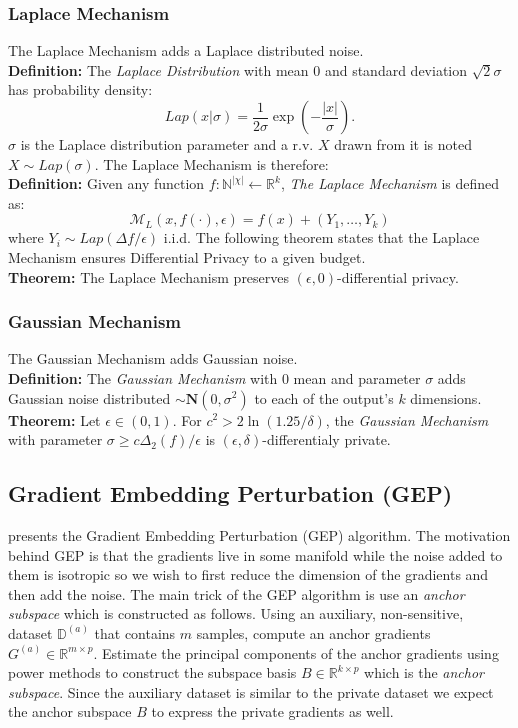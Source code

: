 \documentclass[fourier]{_style/dissertation}
\begin{document}
\subsubsection{Laplace Mechanism}
The Laplace Mechanism adds a Laplace distributed noise. \\
\textbf{Definition:} The \textit{Laplace Distribution} with mean 0 and standard deviation $\sqrt{2} \sigma$ has probability density:
$$ Lap(x|\sigma)=\frac{1}{2\sigma}\exp \left (- \frac{|x|}{\sigma} \right ).$$ $\sigma$ is the Laplace distribution parameter and a r.v. $X$ drawn from it is noted $X \sim Lap(\sigma)$.
The Laplace Mechanism is therefore: \\
\textbf{Definition:} Given any function $f:\mathbb{N}^{|\chi|} \leftarrow \mathbb{R}^{k}$, \textit{The Laplace Mechanism} is defined as:
$$ \mathcal{M}_{L}(x,f(\cdot), \epsilon) = f(x)+(Y_{1},\ldots ,Y_{k})$$
where $Y_{i} \sim Lap(\Delta f / \epsilon)$ i.i.d.
The following theorem states that the Laplace Mechanism ensures Differential Privacy to a given budget. \\
\textbf{Theorem:} The Laplace Mechanism preserves $(\epsilon, 0)$-differential privacy.
\subsubsection{Gaussian Mechanism}
The Gaussian Mechanism adds Gaussian noise. \\
\textbf{Definition:} The \textit{Gaussian Mechanism} with 0 mean and parameter $\sigma$ adds Gaussian noise distributed $\sim \mathbf{N}(0,\sigma^{2})$ to each of the output's $k$ dimensions.\\
\textbf{Theorem:} Let $\epsilon \in (0,1)$. For $c^{2} > 2 \ln(1.25/\delta)$, the \textit{Gaussian Mechanism} with parameter $\sigma \geq c\Delta_{2}(f)/\epsilon$ is $(\epsilon, \delta)$-differentialy private.

\subsection{Gradient Embedding Perturbation (GEP)}
\label{GEP}
\cite{Yu2021DoLearning} presents the Gradient Embedding Perturbation (GEP) algorithm. The motivation behind GEP is that the gradients live in some manifold while the noise added to them is isotropic so we wish to first reduce the dimension of the gradients and then add the noise. The main trick of the GEP algorithm is use an \textit{anchor subspace} which is constructed as follows. Using an auxiliary, non-sensitive, dataset $\mathbb{D}^{(a)}$ that contains $m$ samples, compute an anchor gradients $G^{(a)} \in \mathbb{R}^{m \times p}$. Estimate the principal components of the anchor gradients using power methods to construct the subspace basis $B \in \mathbb{R}^{k \times p}$ which is the \textit{anchor subspace}. Since the auxiliary dataset is similar to the private dataset we expect the anchor subspace $B$ to express the private gradients as well. 
\end{document}
